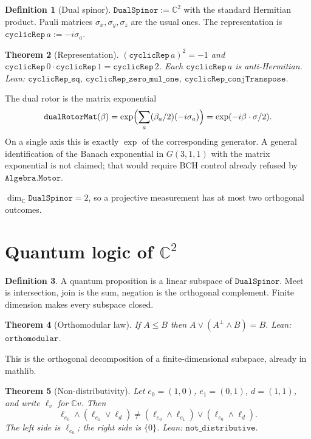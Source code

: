 \documentclass[dvipdfmx,11pt,a4paper]{article}
\newtheorem{theorem}{Theorem}[section]
\theoremstyle{definition}
\newtheorem{definition}[theorem]{Definition}
\theoremstyle{remark}
\begin{document}
\begin{definition}[Dual spinor]
$\texttt{DualSpinor}:=\mathbb{C}^2$ with the standard Hermitian
product. Pauli matrices $\sigma_x,\sigma_y,\sigma_z$ are the usual
ones. The representation is
$\texttt{cyclicRep}\,a:=-i\sigma_a$.
\end{definition}

\begin{theorem}[Representation]
\label{thm:rep}
$(\texttt{cyclicRep}\,a)^2=-1$ and
$\texttt{cyclicRep}\,0\cdot\texttt{cyclicRep}\,1=\texttt{cyclicRep}\,2$.
Each $\texttt{cyclicRep}\,a$ is anti-Hermitian. Lean:
$\texttt{cyclicRep\_sq}$, $\texttt{cyclicRep\_zero\_mul\_one}$,
$\texttt{cyclicRep\_conjTranspose}$.
\end{theorem}

The dual rotor is the matrix exponential
\[
\texttt{dualRotorMat}(\beta)
=\exp\Bigl(\sum_a(\beta_a/2)(-i\sigma_a)\Bigr)
=\exp(-i\beta\cdot\sigma/2).
\]
On a single axis this is exactly $\exp$ of the corresponding generator.
A general identification of the Banach exponential in $G(3,1,1)$ with
the matrix exponential is not claimed; that would require BCH control
already refused by $\texttt{Algebra.Motor}$.

$\dim_{\mathbb{C}}\texttt{DualSpinor}=2$, so a projective measurement
has at most two orthogonal outcomes.

\section{Quantum logic of $\mathbb{C}^2$}
\label{sec:ql}

\begin{definition}
A quantum proposition is a linear subspace of $\texttt{DualSpinor}$.
Meet is intersection, join is the sum, negation is the orthogonal
complement. Finite dimension makes every subspace closed.
\end{definition}

\begin{theorem}[Orthomodular law]
\label{thm:om}
If $A\le B$ then $A\vee(A^\perp\wedge B)=B$. Lean:
$\texttt{orthomodular}$.
\end{theorem}

This is the orthogonal decomposition of a finite-dimensional subspace,
already in mathlib.

\begin{theorem}[Non-distributivity]
\label{thm:ndist}
Let $e_0=(1,0)$, $e_1=(0,1)$, $d=(1,1)$, and write $\ell_v$ for
$\mathbb{C}v$. Then
\[
\ell_{e_0}\wedge(\ell_{e_1}\vee\ell_d)
\neq
(\ell_{e_0}\wedge\ell_{e_1})\vee(\ell_{e_0}\wedge\ell_d).
\]
The left side is $\ell_{e_0}$; the right side is $\{0\}$. Lean:
$\texttt{not\_distributive}$.
\end{theorem}
\end{document}
